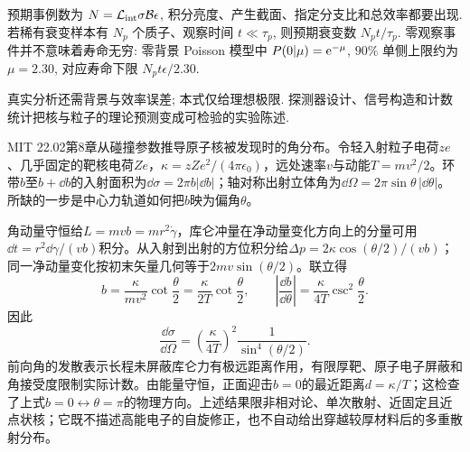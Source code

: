 预期事例数为 $N=\mathcal L_{\rm int}\sigma\mathcal B\epsilon$, 积分亮度、产生截面、指定分支比和总效率都要出现. 若稀有衰变样本有 $N_p$ 个质子、观察时间 $t\ll\tau_p$, 则预期衰变数 $N_p t/\tau_p$. 零观察事件并不意味着寿命无穷: 零背景 Poisson 模型中 $P(0|\mu)=\mathrm e^{-\mu}$, $90\%$ 单侧上限约为 $\mu=2.30$, 对应寿命下限 $N_pt\epsilon/2.30$.

真实分析还需背景与效率误差; 本式仅给理想极限. 探测器设计、信号构造和计数统计把核与粒子的理论预测变成可检验的实验陈述.

MIT 22.02第8章从碰撞参数推导原子核被发现时的角分布。令轻入射粒子电荷$ze$、几乎固定的靶核电荷$Ze$，$\kappa=zZe^2/(4\pi\epsilon_0)$，远处速率$v$与动能$T=mv^2/2$。环带$b$至$b+\dd b$的入射面积为$\dd\sigma=2\pi b|\dd b|$；轴对称出射立体角为$\dd\Omega=2\pi\sin\theta\,|\dd\theta|$。所缺的一步是中心力轨道如何把$b$映为偏角$\theta$。

角动量守恒给$L=mvb=mr^2\dot\gamma$，库仑冲量在净动量变化方向上的分量可用$\dd t=r^2\dd\gamma/(vb)$积分。从入射到出射的方位积分给$\Delta p=2\kappa\cos(\theta/2)/(vb)$；同一净动量变化按初末矢量几何等于$2mv\sin(\theta/2)$。联立得
\begin{equation}
b=\frac{\kappa}{mv^2}\cot\frac\theta2
=\frac{\kappa}{2T}\cot\frac\theta2,\qquad
\left|\frac{\dd b}{\dd\theta}\right|
=\frac{\kappa}{4T}\csc^2\frac\theta2 .
\end{equation}
因此
\begin{equation}
\boxed{\frac{\dd\sigma}{\dd\Omega}
=\left(\frac{\kappa}{4T}\right)^2\frac1{\sin^4(\theta/2)}} .
\end{equation}
前向角的发散表示长程未屏蔽库仑力有极远距离作用，有限厚靶、原子电子屏蔽和角接受度限制实际计数。由能量守恒，正面迎击$b=0$的最近距离$d=\kappa/T$；这检查了上式$b=0\leftrightarrow\theta=\pi$的物理方向。上述结果限非相对论、单次散射、近固定且近点状核；它既不描述高能电子的自旋修正，也不自动给出穿越较厚材料后的多重散射分布。
